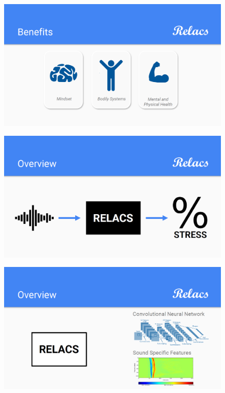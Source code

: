 \documentclass[a4paper]{article}
\begin{document}
\begin{figure}[h]
\centering
\includegraphics[width=\linewidth]{./Slide4}
\label{fig:Slide4}
\end{figure}

\begin{figure}[h]
\centering
\includegraphics[width=\linewidth]{./Slide5}
\label{fig:Slide5}
\end{figure}

\begin{figure}[h]
\centering
\includegraphics[width=\linewidth]{./Slide6}
\label{fig:Slide6}
\end{figure}
\end{document}
